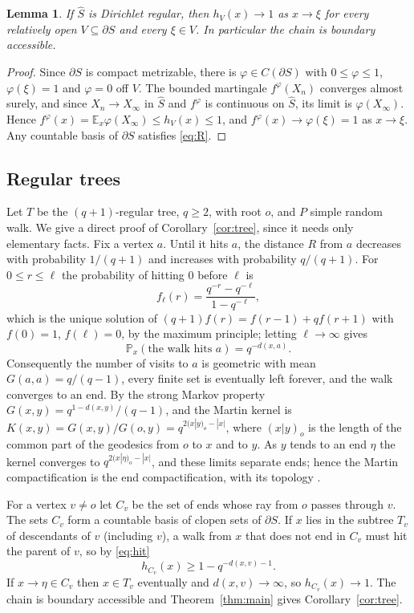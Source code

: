 \documentclass[11pt]{amsart}
\newtheorem{lemma}[theorem]{Lemma}
\theoremstyle{definition}
\theoremstyle{remark}
\numberwithin{equation}{section}
\newcommand{\E}{\mathbb E}
\newcommand{\Pp}{\mathbb P}
\newcommand{\1}{\mathbf 1}
\newcommand{\K}{\widehat S}
\newcommand{\bd}{\partial S}
\begin{document}
\begin{lemma}\label{lem:regular}
If $\K$ is Dirichlet regular, then $h_V(x)\to1$ as $x\to\xi$ for every relatively open $V\subseteq\bd$ and every $\xi\in V$. In particular the chain is boundary accessible.
\end{lemma}

\begin{proof}
Since $\bd$ is compact metrizable, there is $\varphi\in C(\bd)$ with $0\le\varphi\le1$, $\varphi(\xi)=1$ and $\varphi=0$ off $V$. The bounded martingale $f^\varphi(X_n)$ converges almost surely, and since $X_n\to X_\infty$ in $\K$ and $f^\varphi$ is continuous on $\K$, its limit is $\varphi(X_\infty)$. Hence $f^\varphi(x)=\E_x\varphi(X_\infty)\le h_V(x)\le1$, and $f^\varphi(x)\to\varphi(\xi)=1$ as $x\to\xi$. Any countable basis of $\bd$ satisfies \eqref{eq:R}.
\end{proof}

\subsection{Regular trees}\label{sec:tree}
Let $T$ be the $(q+1)$-regular tree, $q\ge2$, with root $o$, and $P$ simple random walk. We give a direct proof of Corollary~\ref{cor:tree}, since it needs only elementary facts. Fix a vertex $a$. Until it hits $a$, the distance $R$ from $a$ decreases with probability $1/(q+1)$ and increases with probability $q/(q+1)$. For $0\le r\le\ell$ the probability of hitting $0$ before $\ell$ is
\[
f_\ell(r)=\frac{q^{-r}-q^{-\ell}}{1-q^{-\ell}},
\]
which is the unique solution of $(q+1)f(r)=f(r-1)+qf(r+1)$ with $f(0)=1$, $f(\ell)=0$, by the maximum principle; letting $\ell\to\infty$ gives
\begin{equation}\label{eq:hit}
\Pp_x(\text{the walk hits }a)=q^{-d(x,a)}.
\end{equation}
Consequently the number of visits to $a$ is geometric with mean $G(a,a)=q/(q-1)$, every finite set is eventually left forever, and the walk converges to an end. By the strong Markov property $G(x,y)=q^{1-d(x,y)}/(q-1)$, and the Martin kernel is $K(x,y)=G(x,y)/G(o,y)=q^{2(x|y)_o-|x|}$, where $(x|y)_o$ is the length of the common part of the geodesics from $o$ to $x$ and to $y$. As $y$ tends to an end $\eta$ the kernel converges to $q^{2(x|\eta)_o-|x|}$, and these limits separate ends; hence the Martin compactification is the end compactification, with its topology \cite{Car,Woe}.

For a vertex $v\ne o$ let $C_v$ be the set of ends whose ray from $o$ passes through $v$. The sets $C_v$ form a countable basis of clopen sets of $\bd$. If $x$ lies in the subtree $T_v$ of descendants of $v$ (including $v$), a walk from $x$ that does not end in $C_v$ must hit the parent of $v$, so by \eqref{eq:hit}
\[
h_{C_v}(x)\ge1-q^{-d(x,v)-1}.
\]
If $x\to\eta\in C_v$ then $x\in T_v$ eventually and $d(x,v)\to\infty$, so $h_{C_v}(x)\to1$. The chain is boundary accessible and Theorem~\ref{thm:main} gives Corollary~\ref{cor:tree}.
\end{document}
